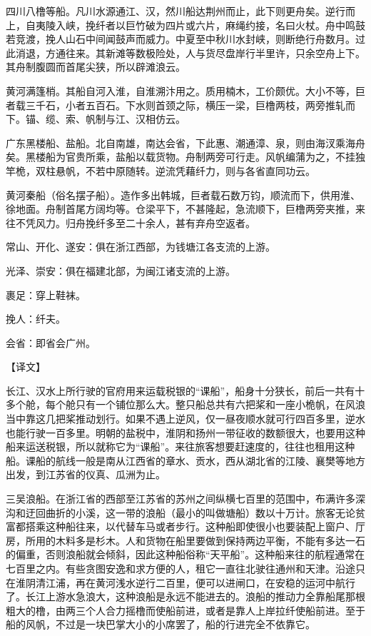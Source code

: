 \documentclass[12pt,UTF8]{ctexbook}
\begin{document}
四川八橹等船。凡川水源通江、汉，然川船达荆州而止，此下则更舟矣。逆行而上，自夷陵入峡，挽纤者以巨竹破为四片或六片，麻绳约接，名曰火杖。舟中鸣鼓若竞渡，挽人山石中间闻鼓声而威力。中夏至中秋川水封峡，则断绝行舟数月。过此消退，方通往来。其新滩等数极险处，人与货尽盘岸行半里许，只余空舟上下。其舟制腹圆而首尾尖狭，所以辟滩浪云。

黄河满篷梢。其船自河入淮，自淮溯汴用之。质用楠木，工价颇优。大小不等，巨者载三千石，小者五百石。下水则首颈之际，横压一梁，巨橹两枝，两旁推轧而下。锚、缆、索、帆制与江、汉相仿云。

广东黑楼船、盐船。北自南雄，南达会省，下此惠、潮通漳、泉，则由海汊乘海舟矣。黑楼船为官贵所乘，盐船以载货物。舟制两旁可行走。风帆编蒲为之，不挂独竿桅，双柱悬帆，不若中原随转。逆流凭藉纤力，则与各省直同功云。

黄河秦船（俗名摆子船）。造作多出韩城，巨者载石数万钧，顺流而下，供用淮、徐地面。舟制首尾方阔均等。仓梁平下，不甚隆起，急流顺下，巨橹两旁夹推，来往不凭风力。归舟挽纤多至二十余人，甚有弃舟空返者。

常山、开化、遂安：俱在浙江西部，为钱塘江各支流的上游。

光泽、崇安：俱在福建北部，为闽江诸支流的上游。

裹足：穿上鞋袜。

挽人：纤夫。

会省：即省会广州。

【译文】

长江、汉水上所行驶的官府用来运载税银的“课船”，船身十分狭长，前后一共有十多个舱，每个舱只有一个铺位那么大。整只船总共有六把桨和一座小桅帆，在风浪当中靠这几把桨推动划行。如果不遇上逆风，仅一昼夜顺水就可行四百多里，逆水也能行驶一百多里。明朝的盐税中，淮阴和扬州一带征收的数额很大，也要用这种船来运送税银，所以就称它为“课船”。来往旅客想要赶速度的，往往也租用这种船。课船的航线一般是南从江西省的章水、贡水，西从湖北省的江陵、襄樊等地方出发，到江苏省的仪真、瓜洲为止。

三吴浪船。在浙江省的西部至江苏省的苏州之间纵横七百里的范围中，布满许多深沟和迂回曲折的小溪，这一带的浪船（最小的叫做塘船）数以十万计。旅客无论贫富都搭乘这种船往来，以代替车马或者步行。这种船即使很小也要装配上窗户、厅房，所用的木料多是杉木。人和货物在船里要做到保持两边平衡，不能有多达一石的偏重，否则浪船就会倾斜，因此这种船俗称“天平船”。这种船来往的航程通常在七百里之内。有些贪图安逸和求方便的人，租它一直往北驶往通州和天津。沿途只在淮阴清江浦，再在黄河浅水逆行二百里，便可以进闸口，在安稳的运河中航行了。长江上游水急浪大，这种浪船是永远不能进去的。浪船的推动力全靠船尾那根粗大的橹，由两三个人合力摇橹而使船前进，或者是靠人上岸拉纤使船前进。至于船的风帆，不过是一块巴掌大小的小席罢了，船的行进完全不依靠它。
\end{document}
